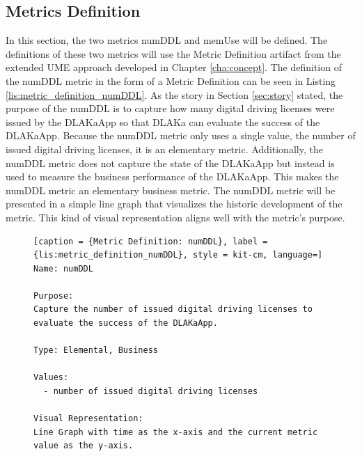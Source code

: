 \subsection{Metrics Definition}

In this section, the two metrics numDDL and memUse will be defined.
The definitions of these two metrics will use the Metric Definition artifact
from the extended UME approach developed in Chapter \ref{cha:concept}.
The definition of the numDDL metric in the form of a
Metric Definition can be seen in Listing \ref{lis:metric_definition_numDDL}.
As the story in Section \ref{sec:story} stated, the purpose of the numDDL is to capture how many
digital driving licenses were issued by the DLAKaApp so that DLAKa can evaluate
the success of the DLAKaApp. Because the numDDL metric only uses a single value,
the number of issued digital driving licenses, it is an elementary metric.
Additionally, the numDDL metric does not capture the state of the DLAKaApp
but instead is used to measure the business performance of the DLAKaApp.
This makes the numDDL metric an elementary business metric.
The numDDL metric will be presented in a simple line graph that visualizes
the historic development of the metric. This kind of visual representation
aligns well with the metric's purpose.

\begin{figure}[tb]
\begin{lstlisting}[caption = {Metric Definition: numDDL}, label = {lis:metric_definition_numDDL}, style = kit-cm, language=]
Name: numDDL

Purpose:
Capture the number of issued digital driving licenses to
evaluate the success of the DLAKaApp.

Type: Elemental, Business

Values:
  - number of issued digital driving licenses

Visual Representation:
Line Graph with time as the x-axis and the current metric value as the y-axis.
\end{lstlisting}
\end{figure}

